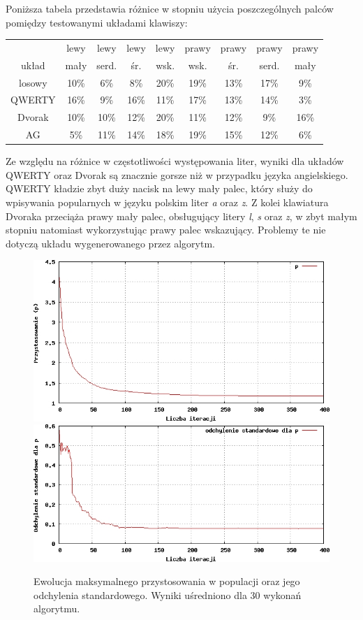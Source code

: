 \documentclass{xmgr}
\begin{document}
Poniższa tabela przedstawia różnice w stopniu użycia poszczególnych palców pomiędzy testowanymi układami klawiszy:\newline\newline
\begin{tabular}{ c | c | c | c | c | c | c | c | c}
                & lewy & lewy      & lewy     & lewy       & prawy      & prawy    & prawy     & prawy \\
  układ         & mały & serd. & śr. & wsk. & wsk. & śr. & serd. & mały \\
  \hline
  losowy        &  10\% & 6\% & 8\% & 20\% &   19\% & 13\% & 17\% & 9\% \\
  QWERTY        &  16\% & 9\% & 16\% & 11\% &  17\% & 13\% & 14\% & 3\% \\
  Dvorak        &  10\% & 10\% & 12\% & 20\% & 11\% & 12\% & 9\% & 16\% \\
  AG            &  5\% & 11\% & 14\% & 18\% &  19\% & 15\% & 12\% & 6\% \\
\end{tabular}\newline\newline

Ze względu na różnice w częstotliwości występowania liter, wyniki dla układów QWERTY oraz Dvorak są znacznie gorsze niż w przypadku języka angielskiego. QWERTY kładzie zbyt duży nacisk na lewy mały palec, który służy do wpisywania popularnych w języku polskim liter \emph{a} oraz \emph{z}. Z kolei klawiatura Dvoraka przeciąża prawy mały palec, obsługujący litery \emph{l}, \emph{s} oraz \emph{z}, w zbyt małym stopniu natomiast wykorzystując prawy palec wskazujący. Problemy te nie dotyczą układu wygenerowanego przez algorytm.

\begin{figure}[!tbh]
\centering
\includegraphics[width=.8\hsize]{fig/fitness_time_pl}
\includegraphics[width=.8\hsize]{fig/std_dev_time_pl}
\caption{Ewolucja maksymalnego przystosowania w populacji oraz jego odchylenia standardowego. Wyniki uśredniono dla 30 wykonań algorytmu.}
\end{figure}
\end{document}
